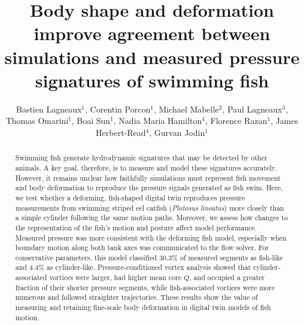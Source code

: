 \documentclass[openacc]{rsproca_new}
\begin{document}
\title{Body shape and deformation improve agreement between simulations and measured pressure signatures of swimming fish}

\author{Bastien Lagneaux$^{1}$, Corentin Porcon$^{1}$, Michael Mabelle$^{2}$, Paul Lagneaux$^{3}$, Thomas Omarini$^{1}$, Boai Sun$^{1}$, Nadia Maria Hamilton$^{4}$, Florence Razan$^{1}$, James Herbert-Read$^{4}$, Gurvan Jodin$^{1}$}

\address{$^{1}$Univ Rennes, ENS Rennes, CNRS IETR -- UMR 6164, Rennes, France\\
$^{2}$AMIAD, France\\
$^{3}$Université Bourgogne Europe, Institut Agro, INRAE, UMR PAM, Dijon, France\\
$^{4}$Department of Zoology, Cambridge University, Cambridge, United Kingdom}

\subject{biomechanics, biological fluid dynamics, sensory ecology}



\begin{abstract}
Swimming fish generate hydrodynamic signatures that may be detected by other animals. A key goal, therefore, is to measure and model these signatures accurately. However, it remains unclear how faithfully simulations must represent fish movement and body deformation to reproduce the pressure signals generated as fish swim. Here, we test whether a deforming, fish-shaped digital twin reproduces pressure measurements from swimming striped eel catfish (\textit{Plotosus lineatus}) more closely than a simple cylinder following the same motion paths. Moreover, we assess how changes to the representation of the fish's motion and posture affect model performance. Measured pressure was more consistent with the deforming fish model, especially when boundary motion along both tank axes was communicated to the flow solver. For conservative parameters, this model classified $30.3\%$ of measured segments as fish-like and $4.4\%$ as cylinder-like. Pressure-conditioned vortex analysis showed that cylinder-associated vortices were larger, had higher mean core $Q$, and occupied a greater fraction of their shorter pressure segments, while fish-associated vortices were more numerous and followed straighter trajectories. These results show the value of measuring and retaining fine-scale body deformation in digital twin models of fish motion.
\end{abstract}
\end{document}
